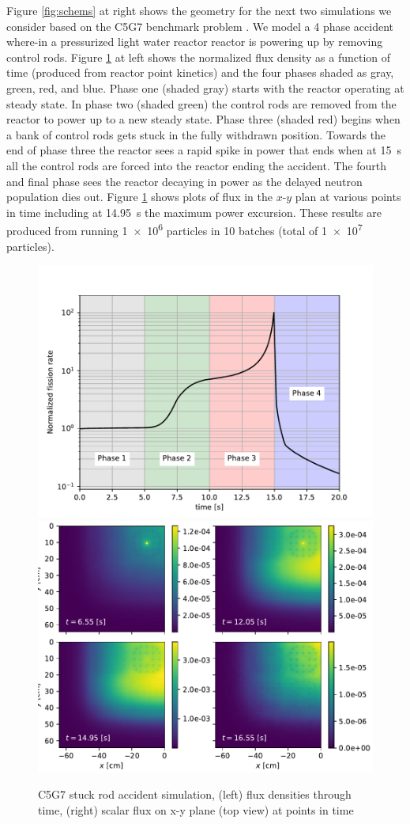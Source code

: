 Figure \ref{fig:schems} at right shows the geometry for the next two simulations we consider based on the C5G7 benchmark problem \cite{jia_hou_oecdnea_2017}.
We model a 4 phase accident where-in a pressurized light water reactor reactor is powering up by removing control rods.
Figure \ref{fig:c5g7} at left shows the normalized flux density as a function of time (produced from reactor point kinetics) and the four phases shaded as gray, green, red, and blue.
Phase one (shaded gray) starts with the reactor operating at steady state.
In phase two (shaded green) the control rods are removed from the reactor to power up to a new steady state.
Phase three (shaded red) begins when a bank of control rods gets stuck in the fully withdrawn position.
Towards the end of phase three the reactor sees a rapid spike in power that ends when at \SI{15}{\s} all the control rods are forced into the reactor ending the accident.
The fourth and final phase sees the reactor decaying in power as the delayed neutron population dies out.
Figure \ref{fig:c5g7} shows plots of flux in the $x$-$y$ plan at various points in time including at \SI{14.95}{\s} the maximum power excursion.
These results are produced from running \num{1e6} particles in \num{10} batches (total of \num{1e7} particles).

\begin{figure}
    \centering
    \includegraphics[width=0.48\linewidth]{monte_carlo/delta_tracking/figures/c5/acc.pdf}
    \includegraphics[width=0.48\linewidth]{monte_carlo/delta_tracking/figures/c5/flux.pdf}
    \caption{C5G7 stuck rod accident simulation, (left) flux densities through time, (right) scalar flux on x-y plane (top view) at points in time}
    \label{fig:c5g7}
\end{figure}

